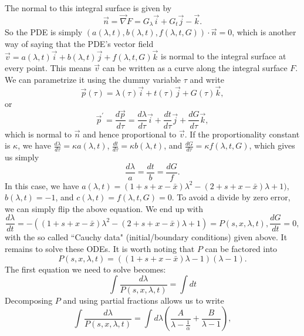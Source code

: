 \documentclass[10pt]{revtex4}
\begin{document}
The normal to this integral surface is given by
\begin{equation}
\vec{n} = \vec{\nabla} F = G_\lambda \vec{i} + G_t \vec{j} - \vec{k}.
\end{equation}
So the PDE is simply $(a(\lambda,t),b(\lambda,t),f(\lambda,t,G)) \cdot \vec{n} = 0$, which is another way of saying that the PDE's vector field $\vec{v} = a(\lambda,t)\vec{i} + b(\lambda,t)\vec{j} + f(\lambda,t,G)\vec{k}$ is normal to the integral surface at every point.
This means $\vec{v}$ can be written as a curve along the integral surface $F$.
We can parametrize it using the dummy variable $\tau$ and write
\begin{equation}
\vec{p}(\tau ) = \lambda(\tau) \vec{i} + t(\tau) \vec{j} + G(\tau ) \vec{k},
\end{equation}
or
\begin{equation}
\vec{p}^\prime = \frac{d\vec{p}}{d\tau} = \frac{d\lambda}{d\tau} \vec{i} + \frac{dt}{d\tau} \vec{j} + \frac{dG}{d\tau} \vec{k},
\end{equation}
which is normal to $\vec{n}$ and hence proportional to $\vec{v}$.
If the proportionality constant is $\kappa$, we have $\frac{d\lambda}{d\tau} = \kappa a(\lambda,t)$, $\frac{dt}{d\tau} = \kappa b(\lambda,t)$, and $\frac{dG}{d\tau} = \kappa f(\lambda,t,G)$, which gives us simply
\begin{equation}
\frac{d\lambda}{a} = \frac{dt}{b} = \frac{dG}{f}.
\end{equation}
In this case, we have $a(\lambda, t) = (1+s+x-\bar{x})\lambda^2 - (2+s+x-\bar{x})\lambda + 1)$, $b(\lambda, t) = -1$, and $c(\lambda, t) = f(\lambda,t,G) = 0$.
To avoid a divide by zero error, we can simply flip the above equation.
We end up with
\begin{equation}
\frac{d\lambda}{dt} = -((1+s+x-\bar{x})\lambda^2 - (2+s+x-\bar{x})\lambda + 1) = P(s,x,\lambda, t), \frac{dG}{dt} = 0,
\end{equation}
with the so called ``Cauchy data" (initial/boundary conditions) given above.
It remains to solve these ODEs.
It is worth noting that $P$ can be factored into
\begin{equation}
P(s,x,\lambda, t) = ((1+s+x-\bar{x})\lambda - 1)(\lambda - 1).
\end{equation}
The first equation we need to solve becomes:
\begin{equation}
\int \frac{d\lambda}{P(s,x,\lambda, t)} = \int dt
\end{equation}
Decomposing $P$ and using partial fractions allows us to write
\begin{equation}
\int \frac{d\lambda}{P(s,x,\lambda, t)} = \int d\lambda\left(\frac{A}{\lambda - \frac{1}{\alpha}} + \frac{B}{\lambda - 1} \right),
\end{equation}
\end{document}
